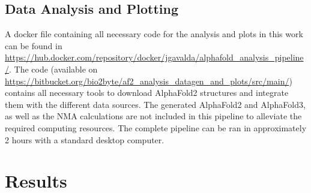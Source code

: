 

\subsection{Data Analysis and Plotting}

A docker file containing all necessary code for the analysis and plots in this work can be found in \url{https://hub.docker.com/repository/docker/jgavalda/alphafold_analysis_pipeline/}. The code (available on \url{https://bitbucket.org/bio2byte/af2_analysis_datagen_and_plots/src/main/}) contains all necessary tools to download AlphaFold2 structures and integrate them with the different data sources. 
The generated AlphaFold2 and AlphaFold3, as well as the NMA calculations are not included in this pipeline to alleviate the required computing resources. The complete pipeline can be ran in approximately 2 hours with a standard desktop computer.

\section{Results}

